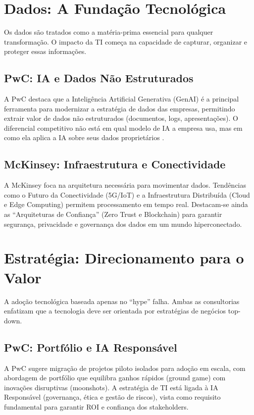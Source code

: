 \documentclass[12pt,a4paper,oneside]{article}
\begin{document}
\section{Dados: A Fundação Tecnológica}

Os dados são tratados como a matéria-prima essencial para qualquer transformação. O impacto da TI começa na capacidade de capturar, organizar e proteger essas informações.

\subsection{PwC: IA e Dados Não Estruturados}

A PwC destaca que a Inteligência Artificial Generativa (GenAI) é a principal ferramenta para modernizar a estratégia de dados das empresas, permitindo extrair valor de dados não estruturados (documentos, logs, apresentações). O diferencial competitivo não está em qual modelo de IA a empresa usa, mas em como ela aplica a IA sobre seus dados proprietários \cite{pwc2024}.

\subsection{McKinsey: Infraestrutura e Conectividade}

A McKinsey foca na arquitetura necessária para movimentar dados. Tendências como o Futuro da Conectividade (5G/IoT) e a Infraestrutura Distribuída (Cloud e Edge Computing) permitem processamento em tempo real. Destacam-se ainda as ``Arquiteturas de Confiança'' (Zero Trust e Blockchain) para garantir segurança, privacidade e governança dos dados em um mundo hiperconectado.

\section{Estratégia: Direcionamento para o Valor}

A adoção tecnológica baseada apenas no ``hype'' falha. Ambas as consultorias enfatizam que a tecnologia deve ser orientada por estratégias de negócios top-down.

\subsection{PwC: Portfólio e IA Responsável}

A PwC sugere migração de projetos piloto isolados para adoção em escala, com abordagem de portfólio que equilibra ganhos rápidos (ground game) com inovações disruptivas (moonshots). A estratégia de TI está ligada à IA Responsável (governança, ética e gestão de riscos), vista como requisito fundamental para garantir ROI e confiança dos stakeholders.
\end{document}
